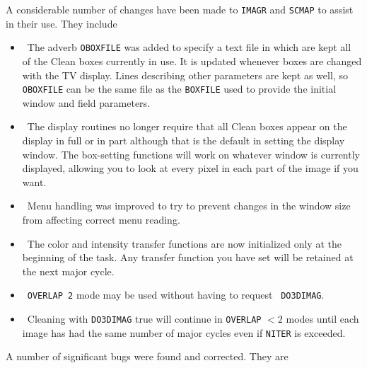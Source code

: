A considerable number of changes have been made to {\tt IMAGR} and
{\tt SCMAP} to assist in their use.  They include
\begin{itemize}
\item\ The adverb {\tt OBOXFILE} was added to specify a text file in
    which are kept all of the Clean boxes currently in use.  It is
    updated whenever boxes are changed with the TV display.  Lines
    describing other parameters are kept as well, so {\tt OBOXFILE}
    can be the same file as the {\tt BOXFILE} used to provide the
    initial window and field parameters.
\item\ The display routines no longer require that all Clean boxes
    appear on the display in full or in part although that is the
    default in setting the display window.  The box-setting functions
    will work on whatever window is currently displayed, allowing you
    to look at every pixel in each part of the image if you want.
\item\ Menu handling was improved to try to prevent changes in the
    window size from affecting correct menu reading.
\item\ The color and intensity transfer functions are now initialized
    only at the beginning of the task.  Any transfer function you have
    set will be retained at the next major cycle.
\item\ {\tt OVERLAP 2} mode may be used without having to request {\tt
    DO3DIMAG}\@.
\item\ Cleaning with {\tt DO3DIMAG} true will continue in {\tt OVERLAP}
   $< 2$ modes until each image has had the same number of major
   cycles even if {\tt NITER} is exceeded.
\end{itemize}
A number of significant bugs were found and corrected.  They are

